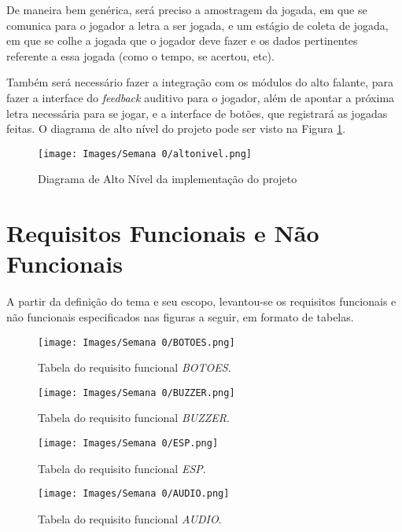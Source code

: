 \documentclass[amsmath,amssymb,floatfix]{report}
\begin{document}
De maneira bem genérica, será preciso a amostragem da jogada, em que se comunica para o jogador a letra a ser jogada, e um estágio de coleta de jogada, em que se colhe a jogada que o jogador deve fazer e os dados pertinentes referente a essa jogada (como o tempo, se acertou, etc). 

Também será necessário fazer a integração com os módulos do alto falante, para fazer a interface do \textit{feedback} auditivo para o jogador, além de apontar a próxima letra necessária para se jogar, e a interface de botões, que registrará as jogadas feitas. O diagrama de alto nível do projeto pode ser visto na Figura \ref{fig:altonivel}.

\begin{figure}[H]
\centering
\texttt{[image: Images/Semana 0/altonivel.png]} 
    \caption{Diagrama de Alto Nível da implementação do projeto}
    \label{fig:altonivel}
\end{figure}

\section{Requisitos Funcionais e Não Funcionais}

A partir da definição do tema e seu escopo, levantou-se os requisitos funcionais e não funcionais especificados nas figuras a seguir, em formato de tabelas.

\begin{figure}[H]
\centering
\texttt{[image: Images/Semana 0/BOTOES.png]} 
    \caption{Tabela do requisito funcional \textit{BOTOES}.}
    \label{fig:botoes}
\end{figure}

\begin{figure}[H]
\centering
\texttt{[image: Images/Semana 0/BUZZER.png]} 
    \caption{Tabela do requisito funcional \textit{BUZZER}.}
    \label{fig:buzzer}
\end{figure}

\begin{figure}[H]
\centering
\texttt{[image: Images/Semana 0/ESP.png]} 
    \caption{Tabela do requisito funcional \textit{ESP}.}
    \label{fig:esp}
\end{figure}

\begin{figure}[H]
\centering
\texttt{[image: Images/Semana 0/AUDIO.png]} 
    \caption{Tabela do requisito funcional \textit{AUDIO}.}
    \label{fig:audio}
\end{figure}
\end{document}
